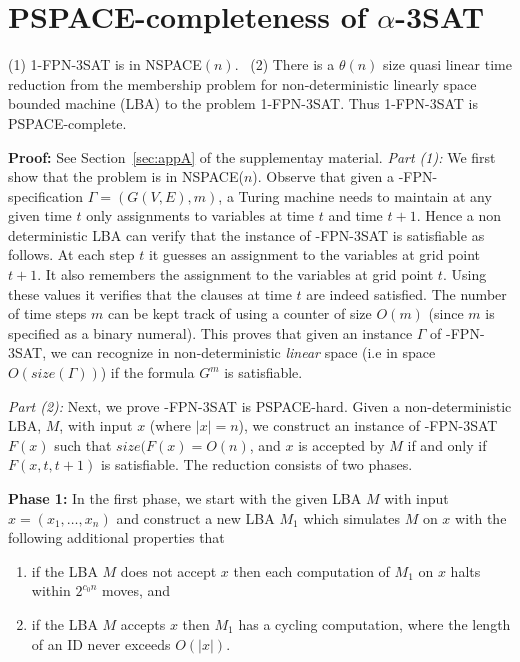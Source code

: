 \section{PSPACE-completeness of $\alpha$-3SAT}\label{sec:hard_3sat}

\begin{theorem}\label{th:fpn-3sat}
(1) 1-FPN-3SAT is in NSPACE$(n)$.~
(2) There is a $\theta(n)$ size 
quasi linear time reduction from the membership problem
for  non-deterministic linearly space bounded machine (LBA) 
to the problem 1-FPN-3SAT. 
Thus 1-FPN-3SAT is {\sf PSPACE}-complete. 
\end{theorem}

\noindent
{\bf Proof:}  See Section~\ref{sec:appA} of the supplementay material. 
\iffalse
{\em Part (1):}
We first show that the problem is in {\sf NSPACE($n$)}.
Observe that given a {-FPN}-specification 
$\Gamma = (G(V,E), m)$, a Turing machine 
needs to maintain at any given time $t$ 
only assignments to variables at time $t$ and time $t+1$. 
Hence a non deterministic {\sf LBA}
can verify that the instance of {-FPN-3SAT} is satisfiable as follows. At 
each step $t$ it guesses an assignment to the variables at grid point $t+1$.
It also remembers the assignment to the variables at grid point $t$. Using
these values it verifies that the clauses at time $t$ are indeed satisfied.
The number of time steps  $m$ can be kept track of using a counter of size
$O(m)$ (since $m$ is specified as a binary numeral). 
This proves that given an instance $\Gamma$ 
of {-FPN-3SAT}, we can recognize in 
non-deterministic {\em linear } space (i.e in space $O(size(\Gamma))$) 
if the formula $G^m$ is satisfiable.

\noindent
{\em Part (2):}
Next, we prove {-FPN-3SAT} is {\sf PSPACE}-hard. 
Given a non-deterministic {\sf LBA},
$M$, with input $x$ (where $|x| = n$), 
we construct an instance of {-FPN-3SAT} $F(x)$ such that
$size(F(x)=  O(n)$,
and $x$ is accepted by $M$ if and only if $F(x,t,t+1)$ is satisfiable.
The reduction consists of two phases. 

\noindent
{\bf Phase 1:}
In the first phase, we
start with the given {\sf LBA} $M$ with input 
$x = (x_1, \ldots, x_n)$ and construct
a new {\sf LBA} $M_1$ which simulates $M$ on $x$ with the
following additional properties that
\begin{enumerate}
\item
if the {\sf LBA} $M$ does not accept $x$ then
each computation of $M_1$ on $x$ halts within $2^{c_0n}$ moves, and 
\item
if the {\sf LBA} $M$ accepts $x$ then $M_1$ has a cycling computation,
where the length of an ID never exceeds $O(|x|)$.

\end{enumerate}



